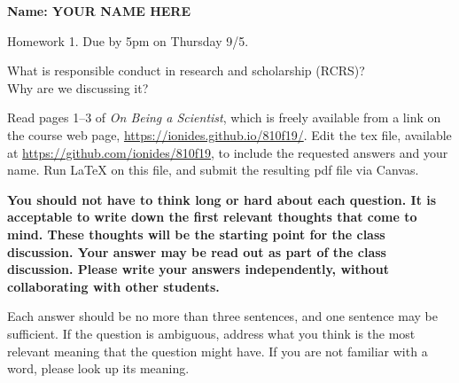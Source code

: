 \documentclass[12pt]{article}
\begin{document}
\begin{center}\bf 
Name: YOUR NAME HERE

Homework 1. Due by 5pm on Thursday 9/5.

What is responsible conduct in research and scholarship (RCRS)? \\
Why are we discussing it? 
\end{center}

Read pages 1--3 of {\em On Being a Scientist}, which is freely available from a link on the course web page, \url{https://ionides.github.io/810f19/}. Edit the tex file, available at \url{https://github.com/ionides/810f19}, to include the requested answers and your name. Run {\LaTeX} on this file, and submit the resulting pdf file via Canvas.

{\bf You should not have to think long or hard about each question. It is acceptable to write down the first relevant thoughts that come to mind. These thoughts will be the starting point for the class discussion. Your answer may be read out as part of the class discussion. Please write your answers independently, without collaborating with other students.

Each answer should be no more than three sentences, and one sentence may be sufficient. If the question is ambiguous, address what you think is the most relevant meaning that the question might have. If you are not familiar with a word, please look up its meaning.

}
\end{document}

